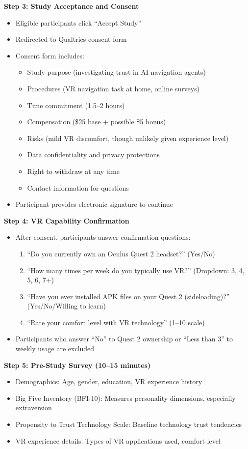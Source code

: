 \documentclass[12pt]{article}
\begin{document}
\textbf{Step 3: Study Acceptance and Consent}
\begin{itemize}
    \item Eligible participants click ``Accept Study''
    \item Redirected to Qualtrics consent form
    \item Consent form includes:
    \begin{itemize}
        \item Study purpose (investigating trust in AI navigation agents)
        \item Procedures (VR navigation task at home, online surveys)
        \item Time commitment (1.5--2 hours)
        \item Compensation (\$25 base + possible \$5 bonus)
        \item Risks (mild VR discomfort, though unlikely given experience level)
        \item Data confidentiality and privacy protections
        \item Right to withdraw at any time
        \item Contact information for questions
    \end{itemize}
    \item Participant provides electronic signature to continue
\end{itemize}

\textbf{Step 4: VR Capability Confirmation}
\begin{itemize}
    \item After consent, participants answer confirmation questions:
    \begin{enumerate}
        \item ``Do you currently own an Oculus Quest 2 headset?'' (Yes/No)
        \item ``How many times per week do you typically use VR?'' (Dropdown: 3, 4, 5, 6, 7+)
        \item ``Have you ever installed APK files on your Quest 2 (sideloading)?'' (Yes/No/Willing to learn)
        \item ``Rate your comfort level with VR technology'' (1--10 scale)
    \end{enumerate}
    \item Participants who answer ``No'' to Quest 2 ownership or ``Less than 3'' to weekly usage are excluded
\end{itemize}

\textbf{Step 5: Pre-Study Survey (10--15 minutes)}
\begin{itemize}
    \item Demographics: Age, gender, education, VR experience history
    \item Big Five Inventory (BFI-10): Measures personality dimensions, especially extraversion
    \item Propensity to Trust Technology Scale: Baseline technology trust tendencies
    \item VR experience details: Types of VR applications used, comfort level
\end{itemize}
\end{document}
